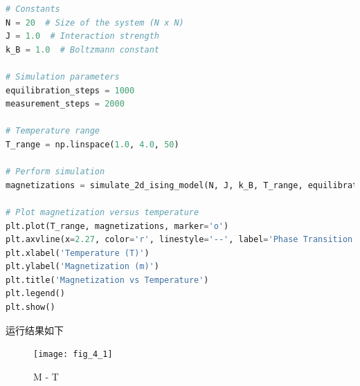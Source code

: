 \documentclass[UTF8]{ctexart}
\begin{document}
\begin{lstlisting}[language=Python, breaklines = true,label={lst:4.1}]
# Constants
N = 20  # Size of the system (N x N)
J = 1.0  # Interaction strength
k_B = 1.0  # Boltzmann constant

# Simulation parameters
equilibration_steps = 1000
measurement_steps = 2000

# Temperature range
T_range = np.linspace(1.0, 4.0, 50)

# Perform simulation
magnetizations = simulate_2d_ising_model(N, J, k_B, T_range, equilibration_steps, measurement_steps)

# Plot magnetization versus temperature
plt.plot(T_range, magnetizations, marker='o')
plt.axvline(x=2.27, color='r', linestyle='--', label='Phase Transition')
plt.xlabel('Temperature (T)')
plt.ylabel('Magnetization (m)')
plt.title('Magnetization vs Temperature')
plt.legend()
plt.show()
    \end{lstlisting}

    运行结果如下
    \begin{figure}[h]
        \centering
        \texttt{[image: fig\_4\_1]}
        \caption{M - T}\label{fig:4.1}
    \end{figure}
\end{document}
